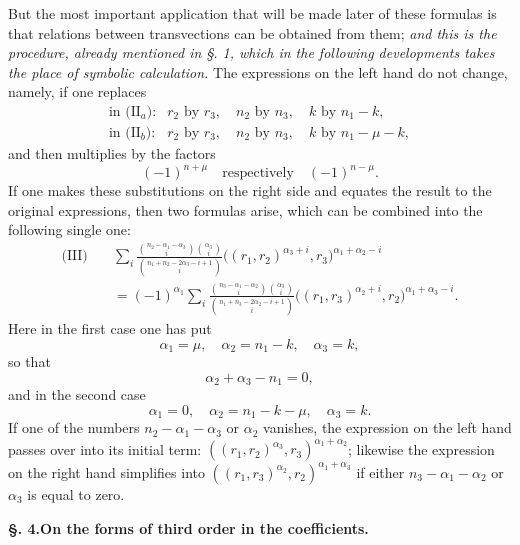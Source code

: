 \documentclass[10pt]{article}
\begin{document}
But the most important application that will be made later of these formulas is that relations between transvections can be obtained from them; \emph{and this is the procedure, already mentioned in §. 1, which in the following developments takes the place of symbolic calculation.} The expressions on the left hand do not change, namely, if one replaces
\[
\begin{array}{ll}
\text{in (II$_a$):} & r_2\text{ by }r_3,\quad n_2\text{ by }n_3,\quad k\text{ by }n_1-k,\\
\text{in (II$_b$):} & r_2\text{ by }r_3,\quad n_2\text{ by }n_3,\quad k\text{ by }n_1-\mu-k,
\end{array}
\]
and then multiplies by the factors
\[
(-1)^{n+\mu}\quad\text{respectively}\quad (-1)^{n-\mu}.
\]
If one makes these substitutions on the right side and equates the result to the original expressions, then two formulas arise, which can be combined into the following single one:
\[
\begin{aligned}
\text{(III)}\quad
&\sum_i\frac{\binom{n_2-\alpha_1-\alpha_3}{i}\binom{\alpha_3}{i}}{\binom{n_1+n_2-2\alpha_3-i+1}{i}}\bigl((r_1,r_2)^{\alpha_3+i},r_3\bigr)^{\alpha_1+\alpha_2-i}\\
&=(-1)^{\alpha_1}\sum_i\frac{\binom{n_3-\alpha_1-\alpha_2}{i}\binom{\alpha_3}{i}}{\binom{n_1+n_3-2\alpha_2-i+1}{i}}\bigl((r_1,r_3)^{\alpha_2+i},r_2\bigr)^{\alpha_1+\alpha_3-i}.
\end{aligned}
\]
Here in the first case one has put
\[
\alpha_1=\mu,\quad \alpha_2=n_1-k,\quad \alpha_3=k,
\]
so that
\[
\alpha_2+\alpha_3-n_1=0,
\]
and in the second case
\[
\alpha_1=0,\quad \alpha_2=n_1-k-\mu,\quad \alpha_3=k.
\]
If one of the numbers $n_2-\alpha_1-\alpha_3$ or $\alpha_2$ vanishes, the expression on the left hand passes over into its initial term: $((r_1,r_2)^{\alpha_3},r_3)^{\alpha_1+\alpha_2}$; likewise the expression on the right hand simplifies into $((r_1,r_3)^{\alpha_2},r_2)^{\alpha_1+\alpha_3}$ if either $n_3-\alpha_1-\alpha_2$ or $\alpha_3$ is equal to zero.

\begin{center}
{\bfseries §. 4.\quad On the forms of third order in the coefficients.}
\end{center}
\end{document}
